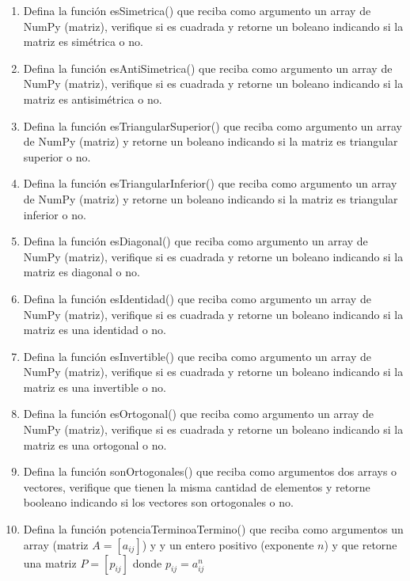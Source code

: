 \documentclass{article}
\begin{document}
\begin{enumerate}
\item Defina la funci\'on esSimetrica() que reciba como argumento un array de NumPy (matriz), verifique si es cuadrada y retorne un boleano indicando si la matriz es sim\'etrica o no.

\item Defina la funci\'on esAntiSimetrica() que reciba como argumento un array de NumPy (matriz), verifique si es cuadrada y retorne un boleano indicando si la matriz es antisim\'etrica o no.

\item Defina la funci\'on esTriangularSuperior() que reciba como argumento un array de NumPy (matriz) y retorne un boleano indicando si la matriz es triangular superior o no.

\item Defina la funci\'on esTriangularInferior() que reciba como argumento un array de NumPy (matriz) y retorne un boleano indicando si la matriz es triangular inferior o no.

\item Defina la funci\'on esDiagonal() que reciba como argumento un array de NumPy (matriz), verifique si es cuadrada y retorne un boleano indicando si la matriz es diagonal o no.

\item Defina la funci\'on esIdentidad() que reciba como argumento un array de NumPy (matriz), verifique si es cuadrada y retorne un boleano indicando si la matriz es una identidad o no.


\item Defina la funci\'on esInvertible() que reciba como argumento un array de NumPy (matriz), verifique si es cuadrada y retorne un boleano indicando si la matriz es una invertible o no.

\item Defina la funci\'on esOrtogonal() que reciba como argumento un array de NumPy (matriz), verifique si es cuadrada y retorne un boleano indicando si la matriz es una ortogonal o no.

\item Defina la funci\'on sonOrtogonales() que reciba como argumentos dos arrays o vectores, verifique que tienen la misma cantidad de elementos y retorne booleano indicando si los vectores son ortogonales o no.

\item Defina la funci\'on potenciaTerminoaTermino() que reciba como argumentos un array (matriz $A=[a _{ij}]$) y y un entero positivo (exponente $n$) y que retorne una matriz $P=[p_{ij}]$ donde $p _{ij}=a_{ij}^n$


\end{enumerate}
\end{document}
